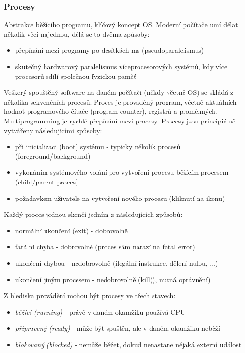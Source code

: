 \subsubsection*{Procesy}
Abstrakce běžícího programu, klíčový koncept OS. Moderní počítače umí dělat několik věcí najednou, dělá se to dvěma způsoby:
\begin{itemize}
\item přepínání mezi programy po desítkách ms (pseudoparalelismus)
\item skutečný hardwarový paralelismus víceprocesorových systémů, kdy více procesorů sdílí společnou fyzickou paměť
\end{itemize}
Veškerý spouštěný software na daném počítači (někdy včetně OS) se skládá z několika sekvenčních procesů. Proces je prováděný program, včetně aktuálních hodnot programového čítače (program counter), registrů a proměnných. Multiprogramming je rychlé přepínání mezi procesy. Procesy jsou principiálně vytvářeny následujícími způsoby:
\begin{itemize}
\item při inicializaci (boot) systému - typicky několik procesů (foreground/background)
\item vykonáním systémového volání pro vytvoření procesu běžícím procesem (child/parent proces)
\item požadavkem uživatele na vytvoření nového procesu (kliknutí na ikonu)
\end{itemize}
Každý proces jednou skončí jedním z následujících způsobů:
\begin{itemize}
\item normální ukončení (exit) - dobrovolně
\item fatální chyba - dobrovolně (proces sám narazí na fatal error)
\item ukončení chybou - nedobrovolně (ilegální instrukce, dělení nulou, ...)
\item ukončení jiným procesem - nedobrovolně (kill(), nutná oprávnění)
\end{itemize}
Z hlediska provádění mohou být procesy ve třech stavech:
\begin{itemize}
\item \textit{běžící (running)} - právě v daném okamžiku používá CPU
\item \textit{připravený (ready)} - může být spuštěn, ale v daném okamžiku neběží
\item \textit{blokovaný (blocked)} - nemůže běžet, dokud nenastane nějaká externí událost
\end{itemize}

